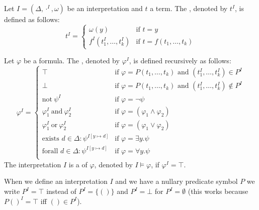 \begin{definition}\label{def.2.22}
	Let $I=(\Delta,\cdot^I,\omega)$ be an interpretation and $t$ a term. The , denoted by $t^I$, is defined as follows:
	\[t^I=
		\begin{cases}
			\omega(y)              & \text{if $t=y$}                \\
			f^I(t^I_1,\dots,t^I_k) & \text{if $t=f(t_1,\dots,t_k)$} 
		\end{cases}\]
		
	Let $\varphi$ be a formula. The , denoted by $\varphi^I$, is defined recursively as follows:
	\[\varphi^I=
		\begin{cases}
			\top                                                   & \text{if $\varphi=P(t_1,\dots,t_k)$ and $(t^I_1,\dots,t^I_k)\in P^I$}    \\
			\bot                                                   & \text{if $\varphi=P(t_1,\dots,t_k)$ and $(t^I_1,\dots,t^I_k)\notin P^I$} \\
			\text{not}~\psi^I                                      & \text{if $\varphi=\neg\psi$}                                             \\
			\varphi^I_1~\text{and}~\varphi^I_2                     & \text{if $\varphi=(\varphi_1\wedge\varphi_2)$}                           \\
			\varphi^I_1~\text{or}~\varphi^I_2                      & \text{if $\varphi=(\varphi_1\vee\varphi_2)$}                             \\
			\text{exists $d\in\Delta$}:\psi^{I\left[y\mapsto d\right]} & \text{if $\varphi=\exists y.\psi$}                                        \\
			\text{forall $d\in\Delta$}:\psi^{I\left[y\mapsto d\right]} & \text{if $\varphi=\forall y.\psi$}                                        \\
		\end{cases}\]
	The interpretation $I$ is a  of $\varphi$, denoted by $I\models\varphi$, if $\varphi^I=\top$.
\end{definition}
When we define an interpretation $I$ and we have a nullary predicate symbol $P$ we write $P^I=\top$ instead of $P^I=\{()\}$ and $P^I=\bot$ for $P^I=\emptyset$ (this works because $P()^I=\top$ iff $()\in P^I$).
